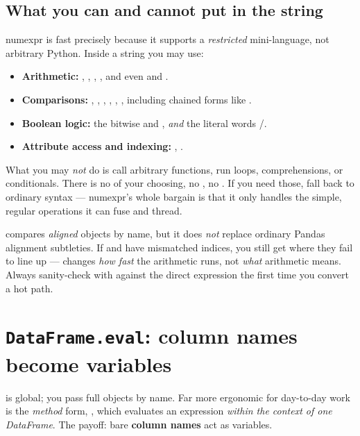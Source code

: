 \documentclass[11pt]{article}
\begin{document}
\subsection{What you can and cannot put in the string}

numexpr is fast precisely because it supports a \emph{restricted} mini-language, not arbitrary Python. Inside a  string you may use:

\begin{itemize}
  \item \textbf{Arithmetic:} \code{+}, \code{-}, \code{*}, \code{/}, and even \code{**} and \code{\%}.
  \item \textbf{Comparisons:} \code{<}, \code{<=}, \code{==}, \code{!=}, \code{>=}, \code{>}, including chained forms like .
  \item \textbf{Boolean logic:} the bitwise \code{&} and \code{|}, \emph{and} the literal words /.
  \item \textbf{Attribute access and indexing:} , .
\end{itemize}

What you may \emph{not} do is call arbitrary functions, run loops, comprehensions, or conditionals. There is no  of your choosing, no , no . If you need those, fall back to ordinary syntax --- numexpr's whole bargain is that it only handles the simple, regular operations it can fuse and thread.

\begin{pitfall}
 compares \emph{aligned} objects by name, but it does \emph{not} replace ordinary Pandas alignment subtleties. If  and  have mismatched indices, you still get  where they fail to line up ---  changes \emph{how fast} the arithmetic runs, not \emph{what} arithmetic means. Always sanity-check with  against the direct expression the first time you convert a hot path.
\end{pitfall}

\section{\texttt{DataFrame.eval}: column names become variables}

 is global; you pass full objects by name. Far more ergonomic for day-to-day work is the \emph{method} form, , which evaluates an expression \emph{within the context of one DataFrame}. The payoff: bare \textbf{column names} act as variables.
\end{document}
